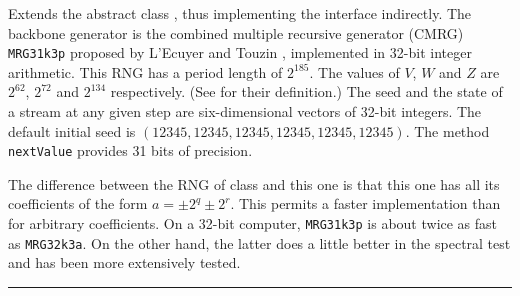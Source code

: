 
Extends the abstract class , thus
implementing the  interface indirectly. The backbone
generator is the combined multiple recursive generator (CMRG) \texttt{MRG31k3p}
proposed by L'Ecuyer and Touzin \cite{rLEC00b},
implemented in 32-bit integer  arithmetic.
This RNG has a period length of 
\latex{$\rho\approx$} $2^{185}$. The values of $V$, $W$ and $Z$ are $2^{62}$,
$2^{72}$ and $2^{134}$ respectively. (See  for their
definition.) The seed and the state of a stream at any given step
are six-dimensional vectors of 32-bit integers.
The default initial seed is $(12345, 12345, 12345, 12345, 12345, 12345)$.
The method \texttt{nextValue} provides 31 bits of precision.

The difference between the RNG of class  and this one is
that this one has all its coefficients of the form
$a = \pm 2^{q} \pm 2^{r}$. This permits a faster implementation than for
arbitrary coefficients.  On a 32-bit computer, \texttt{MRG31k3p} is about twice
as fast as \texttt{MRG32k3a}.
On the other hand, the latter does a little better in the spectral test
and has been more extensively tested.

\bigskip\hrule

